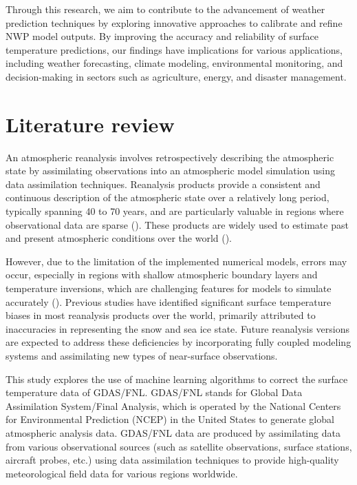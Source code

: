 \documentclass[12pt]{article}
\begin{document}
Through this research, we aim to contribute to the advancement of weather prediction techniques by exploring innovative approaches to calibrate and refine NWP model outputs. By improving the accuracy and reliability of surface temperature predictions, our findings have implications for various applications, including weather forecasting, climate modeling, environmental monitoring, and decision-making in sectors such as agriculture, energy, and disaster management.

\section{Literature review}

An atmospheric reanalysis involves retrospectively describing the atmospheric state by assimilating observations into an atmospheric model simulation using data assimilation techniques. Reanalysis products provide a consistent and continuous description of the atmospheric state over a relatively long period, typically spanning 40 to 70 years, and are particularly valuable in regions where observational data are sparse (\cite{Jung2016}). These products are widely used to estimate past and present atmospheric conditions over the world (\cite{Large2009,Tsujino2018}).

However, due to the limitation of the implemented numerical models, errors may occur, especially in regions with shallow atmospheric boundary layers and temperature inversions, which are challenging features for models to simulate accurately (\cite{Zampieri2018}). Previous studies have identified significant surface temperature biases in most reanalysis products over the world, primarily attributed to inaccuracies in representing the snow and sea ice state. Future reanalysis versions are expected to address these deficiencies by incorporating fully coupled modeling systems and assimilating new types of near-surface observations. 

This study explores the use of machine learning algorithms to correct the surface temperature data of GDAS/FNL. GDAS/FNL stands for Global Data Assimilation System/Final Analysis, which is operated by the National Centers for Environmental Prediction (NCEP) in the United States to generate global atmospheric analysis data. GDAS/FNL data are produced by assimilating data from various observational sources (such as satellite observations, surface stations, aircraft probes, etc.) using data assimilation techniques to provide high-quality meteorological field data for various regions worldwide. 
\end{document}
